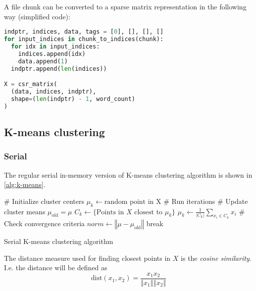 A file chunk can be converted to a sparse matrix representation in the following
way (simplified code):

\begin{lstlisting}[language=python]
indptr, indices, data, tags = [0], [], [], []
for input_indices in chunk_to_indices(chunk):
  for idx in input_indices:
    indices.append(idx)
    data.append(1)
  indptr.append(len(indices))

X = csr_matrix(
  (data, indices, indptr),
  shape=(len(indptr) - 1, word_count)
)
\end{lstlisting}

\subsection{K-means clustering}

\subsubsection{Serial}

The regular serial in-memory version of K-means clustering algorithm is shown in
\cref{alg:k-means}.
\begin{algorithm}[H]
  \begin{algorithmic}[1]
    \State \# Initialize cluster centers
      \State $\mu_k \gets \text{random point in X}$
    \EndFor
    \State \# Run iterations
      \State \# Update cluster means
      \State $\mu_\text{old} = \mu$
        \State $C_k \gets \{\text{Points in }X\text{ closest to }\mu_k\}$
        \State $\mu_k \gets \frac{1}{\vert C_k \vert} \sum_{x_i \in C_k} x_i$
      \EndFor
      \State \# Check convergence criteria
      \State $norm \gets \left\Vert \mu - \mu_\text{old} \right\Vert$
        \State break
      \EndIf
    \EndWhile
  \end{algorithmic}
  \caption{Serial K-means clustering algorithm}
  \label{alg:k-means}
\end{algorithm}

The distance measure used for finding closest points in $X$ is the
\textit{cosine similarity}. I.e. the distance will be defined as
\begin{equation}
  \text{dist}(x_1, x_2) = \frac{x_1 x_2}{\left\Vert x_1 \right\Vert \left\Vert x_2 \right\Vert}
\end{equation}

